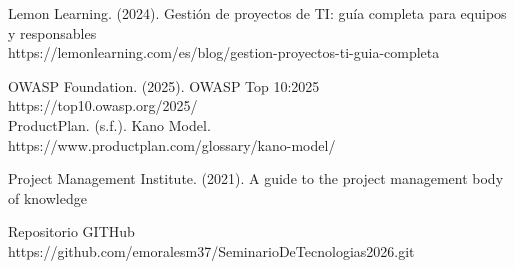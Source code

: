 \documentclass[
	article,			%
	11pt,				%
	oneside,			%
	a4paper,			%
	english,			%
	brazil,				%
	sumario=tradicional
	]{abntex2}
\begin{document}
Lemon Learning. (2024). Gestión de proyectos de TI: guía completa para equipos y responsables  \\
https://lemonlearning.com/es/blog/gestion-proyectos-ti-guia-completa

OWASP Foundation. (2025). OWASP Top 10:2025 \\
 https://top10.owasp.org/2025/ \\

ProductPlan. (s.f.). Kano Model. \\
https://www.productplan.com/glossary/kano-model/

Project Management Institute. (2021). A guide to the project management body of knowledge

Repositorio GITHub \\ https://github.com/emoralesm37/SeminarioDeTecnologias2026.git



%
%








\end{document}
